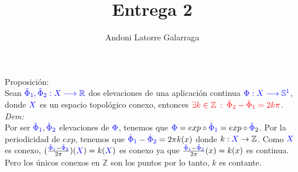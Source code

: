 \documentclass{article}
\title{Entrega 2}
\author{Andoni Latorre Galarraga}
\date{}
\newcommand{\bb}[1]{\mathbb{#1}}
\begin{document}
\maketitle
\textcolor{WildStrawberry}{Proposición:}\\
Sean $\textcolor{blue}{\tilde{\Phi}_1, \tilde{\Phi}_2:X\longrightarrow \bb{R}}$ dos elevaciones de una aplicación continua $\textcolor{blue}{\Phi: X \longrightarrow \bb{S}^1}$, donde $\textcolor{blue}{X}$ es un espacio topológico conexo, entonces $\textcolor{red}{\exists k\in \bb{Z} \: :\: \tilde{\Phi}_2-\tilde{\Phi}_1 = 2k\pi}$.\\

\textcolor{WildStrawberry}{\textit{Dem:}}\\
Por ser $\textcolor{blue}{\tilde{\Phi}_1},\textcolor{blue}{\tilde{\Phi}_2}$ elevaciones de $\textcolor{blue}{\Phi}$, tenemos que $\textcolor{blue}{\Phi} = exp \circ \textcolor{blue}{\tilde{\Phi}_1} = exp \circ \textcolor{blue}{\tilde{\Phi}}_2$. Por la periodicidad de $exp$, tenemos que $\textcolor{blue}{\tilde{\Phi}_1} - \textcolor{blue}{\tilde{\Phi}_2} = 2\pi k(x)$ donde $k:\textcolor{blue}{X}\rightarrow \bb{Z}$. Como $\textcolor{blue}{X}$ es conexo, $(\frac{\textcolor{blue}{\tilde{\Phi}_1}- \textcolor{blue}{\tilde{\Phi}_2}}{2\pi})(\textcolor{blue}{X})=k(\textcolor{blue}{X})$ es conexo ya que $\frac{\textcolor{blue}{\tilde{\Phi}_1}- \textcolor{blue}{\tilde{\Phi}_2}}{2\pi}(x)=k(x)$ es continua. Pero los únicos conexos en $\bb{Z}$ son los puntos por lo tanto, $k$ es contante.
\end{document}
